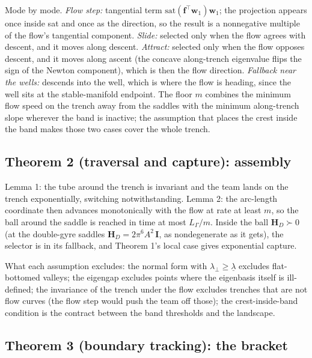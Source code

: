 \documentclass[11pt]{article}
\begin{document}
Mode by mode. \emph{Flow step:} tangential term
$\mathrm{sat}(\mathbf{f}^\top\mathbf{w}_1)\mathbf{w}_1$; the projection
appears once inside sat and once as the direction, so the result is a
nonnegative multiple of the flow's tangential component. \emph{Slide:}
selected only when the flow agrees with descent, and it moves along
descent. \emph{Attract:} selected only when the flow opposes descent, and
it moves along ascent (the concave along-trench eigenvalue flips the sign
of the Newton component), which is then the flow direction. \emph{Fallback
near the wells:} descends into the well, which is where the flow is
heading, since the well sits at the stable-manifold endpoint. The floor
$m$ combines the minimum flow speed on the trench away from the saddles
with the minimum along-trench slope wherever the band is inactive; the
assumption that places the crest inside the band makes those two cases
cover the whole trench.

\subsection{Theorem 2 (traversal and capture): assembly}

Lemma 1: the tube around the trench is invariant and the team lands on the
trench exponentially, switching notwithstanding. Lemma 2: the arc-length
coordinate then advances monotonically with the flow at rate at least $m$,
so the ball around the saddle is reached in time at most
$L_\Gamma/m$. Inside the ball $\mathbf{H}_D \succ 0$ (at the double-gyre
saddles $\mathbf{H}_D = 2\pi^6A^2\,\mathbf{I}$, as nondegenerate as it
gets), the selector is in its fallback, and Theorem 1's local case gives
exponential capture.

What each assumption excludes: the normal form with
$\lambda_\perp \geq \underline{\lambda}$ excludes flat-bottomed valleys;
the eigengap excludes points where the eigenbasis itself is ill-defined;
the invariance of the trench under the flow excludes trenches that are not
flow curves (the flow step would push the team off those); the
crest-inside-band condition is the contract between the band thresholds
and the landscape.

\subsection{Theorem 3 (boundary tracking): the bracket}
\end{document}
